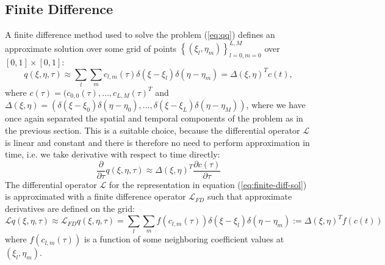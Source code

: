 \documentclass[10pt]{article}
\begin{document}
\subsection{Finite Difference}
A finite difference method used to solve the problem (\ref{eq:qq})
defines an approximate solution over some grid of points
$\left\{(\xi_l, \eta_m) \right\}_{l=0,m=0}^{L,M}$ over $[0,1] \times [0,1]:$
\begin{equation}
  q(\xi,\eta,\tau) \approx \sum_{l}\sum_{m} c_{l,m}(\tau) \delta(\xi-\xi_l) \delta(\eta-\eta_m) = \Delta(\xi,\eta)^T c(t),\label{eq:finite-diff-sol}
\end{equation}
where $c(\tau) = (c_{0,0}(\tau), \ldots, c_{L,M}(\tau)^T$ and
$\Delta(\xi,\eta) = (\delta(\xi-\xi_0) \delta(\eta-\eta_0), \ldots,
\delta(\xi-\xi_L) \delta(\eta-\eta_M))$, where we have once again
separated the spatial and temporal components of the problem as in the
previous section. This is a suitable choice, because the differential
operator $\mathcal{L}$ is linear and constant and there is therefore
no need to perform approximation in time, i.e. we take derivative with
respect to time directly:
\[
  \frac{\partial}{\partial \tau}q(\xi,\eta,\tau) \approx \Delta(\xi,\eta)^T \frac{\partial c(\tau)}{\partial \tau}
\]
The differential operator $\mathcal{L}$ for the representation in
equation (\ref{eq:finite-diff-sol}) is approximated with a finite
difference operator $\mathcal{L}_{FD}$ such that approximate derivatives are defined on the grid:
\[
  \mathcal{L}q(\xi,\eta,\tau) \approx \mathcal{L}_{FD}q(\xi,\eta,\tau) = \sum_{l}\sum_{m} f(c_{l,m}(\tau)) \delta(\xi-\xi_l) \delta(\eta-\eta_m) := \Delta(\xi,\eta)^T f(c(t))
\]
where $f(c_{l,m}(\tau))$ is a function of some neighboring coefficient
values at $(\xi_l, \eta_m)$.
\end{document}

